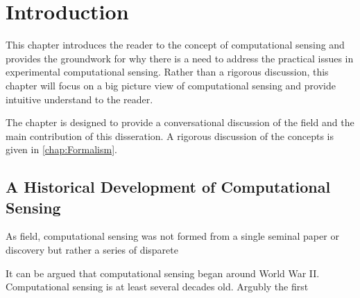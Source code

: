 \chapter{Introduction}\label{sec:chIntrosecHistory}

This chapter introduces the reader to the concept of computational sensing and provides the groundwork for why there is a need to address the practical issues in experimental computational sensing. Rather than a rigorous discussion, this chapter will focus on a big picture view of computational sensing and provide intuitive understand to the reader. 

The chapter is designed to provide a conversational discussion of the field and the main contribution of this disseration. A rigorous discussion of the concepts is given in \autoref{chap:Formalism}.



\section{A Historical Development of Computational Sensing}\label{sec:chIntrosecHistory}

As field, computational sensing was not formed from a single seminal paper or discovery but rather a series of disparete 

It can be argued that computational sensing began around World War II. Computational sensing is at least several decades old. Argubly the first 





%  
%

